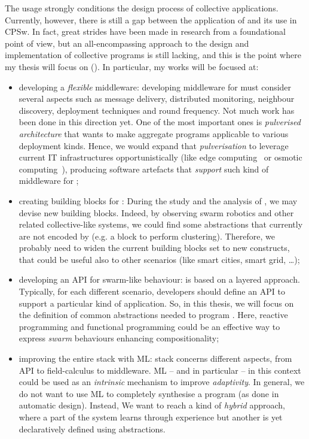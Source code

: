\documentclass[11pt]{article}
\begin{document}
The \ac{} usage strongly conditions the design process of collective applications.
%
Currently, however, there is still a gap between the application of \ac{} and its use in CPSw. 
%
In fact, great strides have been made in research from a foundational point of view, but an all-encompassing approach to the design and implementation of collective programs is still lacking, and this is the point where my thesis will focus on ().
%
In particular, my works will be focused at:
\begin{itemize}
	\item developing a \textit{flexible} middleware: 
	developing middleware for \ac{} must consider several aspects such as message delivery, distributed monitoring, neighbour discovery, deployment techniques and round frequency. Not much work has been done in this direction yet. One of the most important ones is \emph{pulverised architecture}\cite{DBLP:journals/fi/CasadeiPPVW20} that wants to make aggregate programs applicable to various deployment kinds. Hence, we would expand that \emph{pulverisation} to leverage current IT infrastructures opportunistically (like edge computing~\cite{DBLP:journals/computer/Satyanarayanan17} or osmotic computing~\cite{DBLP:journals/cloudcomp/VillariFDRR16}), producing software artefacts that \textit{support} such kind of middleware for \cpsw{};
	\item creating building blocks for \cpsw{}: During the study and the analysis of \cpsw{}, we may devise new building blocks. Indeed, by observing swarm robotics and other related collective-like systems, we could find some abstractions that currently are not encoded by \ac{} (e.g. a block to perform clustering). Therefore, we probably need to widen the current building blocks set to new constructs, that could be useful also to other scenarios (like smart cities, smart grid, \dots{});
	\item developing an API for swarm-like behaviour: \ac{} is based on a layered approach. Typically, for each different scenario, developers should define an API to support a particular kind of application. So, in this thesis, we will focus on the definition of common abstractions needed to program \cpsw{}. Here, reactive programming and functional programming could be an effective way to express \textit{swarm} behaviours enhancing compositionality;
	\item improving the entire \ac{} stack with ML: \ac{} stack concerns different aspects, from API to field-calculus to middleware. ML -- and in particular \rl{} -- in this context could be used as an \emph{intrinsic} mechanism to improve \emph{adaptivity}. In general, we do not want to use ML to completely synthesise a program (as done in automatic design). Instead, We want to reach a kind of \textit{hybrid} approach, where a part of the system learns through experience but another is yet declaratively defined using \ac{} abstractions.
\end{itemize}
\end{document}
